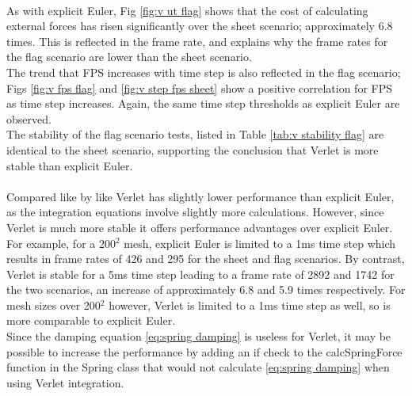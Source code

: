 \\As with explicit Euler, Fig \ref{fig:v ut flag} shows that the cost of calculating external forces has risen significantly over the sheet scenario; approximately 6.8 times. This is reflected in the frame rate, and explains why the frame rates for the flag scenario are lower than the sheet scenario.
\\The trend that FPS increases with time step is also reflected in the flag scenario; Figs \ref{fig:v fps flag} and \ref{fig:v step fps sheet} show a positive correlation for FPS as time step increases. Again, the same time step thresholds as explicit Euler are observed.
\\The stability of the flag scenario tests, listed in Table \ref{tab:v stability flag} are identical to the sheet scenario, supporting the conclusion that Verlet is more stable than explicit Euler.
\\\\Compared like by like Verlet has slightly lower performance than explicit Euler, as the integration equations involve slightly more calculations. However, since Verlet is much more stable it offers performance advantages over explicit Euler. For example, for a 200$^{2}$ mesh, explicit Euler is limited to a 1ms time step which results in frame rates of 426 and 295 for the sheet and flag scenarios. By contrast, Verlet is stable for a 5ms time step leading to a frame rate of 2892 and 1742 for the two scenarios, an increase of approximately 6.8 and 5.9 times respectively. For mesh sizes over 200$^{2}$ however, Verlet is limited to a 1ms time step as well, so is more comparable to explicit Euler.
\\Since the damping equation \ref{eq:spring damping} is useless for Verlet, it may be possible to increase the performance by adding an if check to the calcSpringForce function in the Spring class that would not calculate \ref{eq:spring damping} when using Verlet integration.


